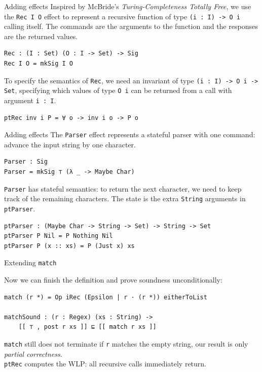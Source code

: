 \documentclass[ignorenonframetext,]{beamer}
\newcommand{\Agda}[1]{\texttt{#1}\xspace}
\newcommand{\match}{\Agda{match}}
\begin{document}
\begin{frame}[fragile]{Adding effects}
Inspired by McBride's \textit{Turing-Completeness Totally Free}, we use the \Agda{Rec I O} effect to represent a recursive function of type \Agda{(i : I) -> O i} calling itself.
The commands are the arguments to the function and the responses are the returned values.
\begin{verbatim}
Rec : (I : Set) (O : I -> Set) -> Sig
Rec I O = mkSig I O
\end{verbatim}
To specify the semantics of \Agda{Rec}, we need an invariant of type \Agda{(i : I) -> O i -> Set},
specifying which values of type \Agda{O i} can be returned from a call with argument \Agda{i : I}.
\begin{verbatim}
ptRec inv i P = ∀ o -> inv i o -> P o
\end{verbatim}
\end{frame}

\begin{frame}[fragile]{Adding effects}
The \Agda{Parser} effect represents a stateful parser with one command:
advance the input string by one character.

\begin{verbatim}
Parser : Sig
Parser = mkSig ⊤ (λ _ -> Maybe Char)
\end{verbatim}

\Agda{Parser} has stateful semantics: to return the next character, we need to keep track of the remaining characters.
The state is the extra \Agda{String} arguments in \Agda{ptParser}.
\begin{verbatim}
ptParser : (Maybe Char -> String -> Set) -> String -> Set
ptParser P Nil = P Nothing Nil
ptParser P (x :: xs) = P (Just x) xs
\end{verbatim}

\end{frame}

\begin{frame}[fragile]{Extending \match}

Now we can finish the definition and prove soundness unconditionally:
\begin{verbatim}
match (r *) = Op iRec (Epsilon | r · (r *)) eitherToList

matchSound : (r : Regex) (xs : String) ->
    [[ ⊤ , post r xs ]] ⊑ [[ match r xs ]]
\end{verbatim}

\pause
\match still does not terminate if \Agda{r} matches the empty string, our result is only \emph{partial correctness}.\\
\Agda{ptRec} computes the WLP: all recursive calls immediately return.
\end{frame}
\end{document}
